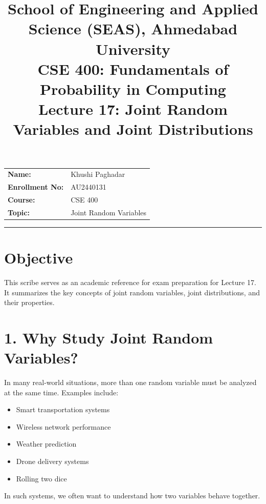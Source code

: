 \documentclass[11pt]{article}
\title{
\normalsize School of Engineering and Applied Science (SEAS), Ahmedabad University \\
\vspace{0.2cm}
\textbf{CSE 400: Fundamentals of Probability in Computing}\\
\Large Lecture 17: Joint Random Variables and Joint Distributions
}
\author{}
\date{}
\begin{document}
\maketitle

\vspace{-1.5cm}

\begin{center}
\begin{tabular}{ll}
\textbf{Name:} & {Khushi Paghadar \hspace{2.5in}} \\ [1.5ex]
\textbf{Enrollment No:} & {AU2440131 \hspace{2.5in}} \\ [1.5ex]
\textbf{Course:} & {CSE 400 \hspace{2.8in}} \\ [1.5ex]
\textbf{Topic:} & {Joint Random Variables} \\ [1.5ex]
\end{tabular}
\end{center}

\hrule
\vspace{0.5cm}

\section*{Objective}

This scribe serves as an academic reference for exam preparation for Lecture 17.  
It summarizes the key concepts of joint random variables, joint distributions, and their properties.

\section*{1. Why Study Joint Random Variables?}

In many real-world situations, more than one random variable must be analyzed at the same time.  
Examples include:

\begin{itemize}
\item Smart transportation systems
\item Wireless network performance
\item Weather prediction
\item Drone delivery systems
\item Rolling two dice
\end{itemize}

In such systems, we often want to understand how two variables behave together.
\end{document}

